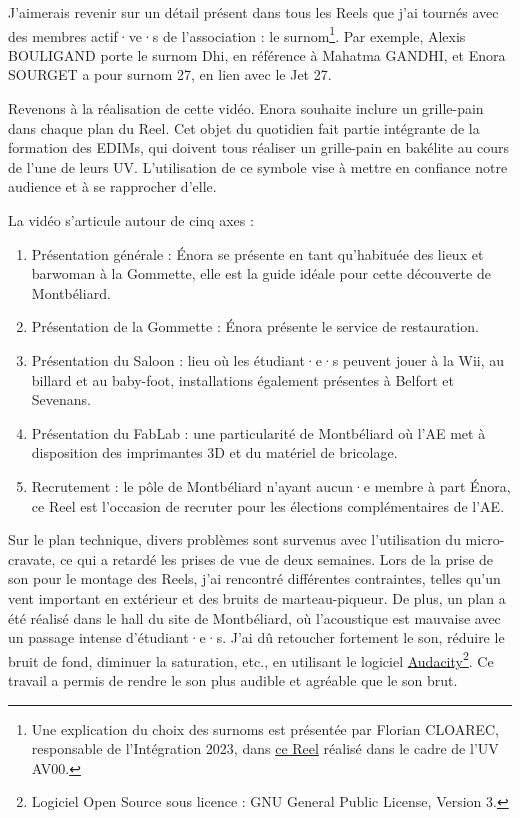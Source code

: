 J'aimerais revenir sur un détail présent dans tous les Reels que j'ai tournés avec des membres actif·ve·s de l'association : le surnom\footnote{Une explication du choix des surnoms est présentée par Florian CLOAREC, responsable de l'Intégration 2023, dans \href{https://www.instagram.com/reel/Cws1eRdr-wV/?utm_source=ig_web_copy_link&igshid=MzRlODBiNWFlZA==}{ce Reel} réalisé dans le cadre de l'UV AV00.}.
Par exemple, Alexis BOULIGAND porte le surnom Dhi, en référence à Mahatma GANDHI, et Enora SOURGET a pour surnom 27, en lien avec le Jet 27.

Revenons à la réalisation de cette vidéo.
Enora souhaite inclure un grille-pain dans chaque plan du Reel.
Cet objet du quotidien fait partie intégrante de la formation des EDIMs, qui doivent tous réaliser un grille-pain en bakélite au cours de l'une de leurs UV. L'utilisation de ce symbole vise à mettre en confiance notre audience et à se rapprocher d'elle.

La vidéo s'articule autour de cinq axes :
\begin{enumerate}
    \item Présentation générale : Énora se présente en tant qu'habituée des lieux et barwoman à la Gommette, elle est la guide idéale pour cette découverte de Montbéliard.
    \item Présentation de la Gommette : Énora présente le service de restauration.
    \item Présentation du Saloon : lieu où les étudiant·e·s peuvent jouer à la Wii, au billard et au baby-foot, installations également présentes à Belfort et Sevenans.
    \item Présentation du FabLab : une particularité de Montbéliard où l'\gls{AE} met à disposition des imprimantes 3D et du matériel de bricolage.
    \item Recrutement : le pôle de Montbéliard n'ayant aucun·e membre à part Énora, ce Reel est l'occasion de recruter pour les élections complémentaires de l'\gls{AE}.
\end{enumerate}

Sur le plan technique, divers problèmes sont survenus avec l'utilisation du micro-cravate, ce qui a retardé les prises de vue de deux semaines.
Lors de la prise de son pour le montage des Reels, j'ai rencontré différentes contraintes, telles qu'un vent important en extérieur et des bruits de marteau-piqueur.
De plus, un plan a été réalisé dans le hall du site de Montbéliard, où l'acoustique est mauvaise avec un passage intense d'étudiant·e·s.
J'ai dû retoucher fortement le son, réduire le bruit de fond, diminuer la saturation, etc., en utilisant le logiciel \href{https://www.audacityteam.org}{Audacity}\footnote{Logiciel Open Source sous licence : GNU General Public License, Version 3.}.
Ce travail a permis de rendre le son plus audible et agréable que le son brut.

